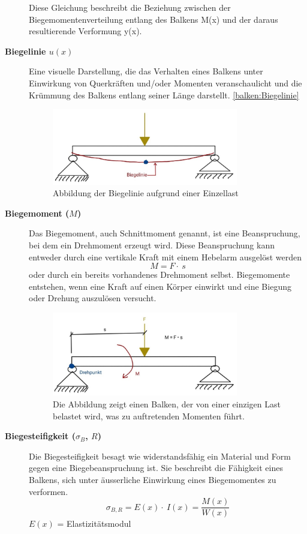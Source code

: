 \begin{description}
Diese Gleichung beschreibt die Beziehung zwischen der Biegemomentenverteilung entlang des Balkens M(x) und der daraus resultierende Verformung y(x).
\item[\textbf{Biegelinie $u(x)$}] Eine visuelle Darstellung, die das Verhalten eines Balkens unter Einwirkung von Querkräften und/oder Momenten veranschaulicht und die Krümmung des Balkens entlang seiner Länge darstellt. \ref{balken:Biegelinie}
\begin{figure} [h]
	\centering
	\includegraphics[width=0.8\textwidth]{papers/balken/images/teil1/Biegelinie1.jpg}
	\caption{Abbildung der Biegelinie aufgrund einer Einzellast}
	\label{fig:Abbildung der Biegelinie aufgrund einer Einzellast}
\end{figure}
\item[\textbf{Biegemoment ($M$)}] Das Biegemoment, auch Schnittmoment genannt, ist eine Beanspruchung, bei dem ein Drehmoment erzeugt wird.
Diese Beanspruchung kann entweder durch eine vertikale Kraft mit einem Hebelarm ausgelöst werden
\begin{equation}
	M=
	F\cdot\ s
\end{equation}
oder durch ein bereits vorhandenes Drehmoment selbst.
Biegemomente entstehen, wenn eine Kraft auf einen Körper einwirkt und eine Biegung oder Drehung auszulösen versucht.
\begin{figure} [h]
	\centering
	\includegraphics[width=0.8\textwidth]{papers/balken/images/teil1/Biegemoment.jpg}
	\caption{Die Abbildung zeigt einen Balken, der von einer einzigen Last belastet wird, was zu auftretenden Momenten führt.}
	\label{fig:Die Abbildung zeigt einen Balken, der von einer einzigen Last belastet wird, was zu auftretenden Momenten führt.}
\end{figure}
\item[\textbf{Biegesteifigkeit ($σ_B$, $R$)}] Die Biegesteifigkeit besagt wie widerstandsfähig ein Material und Form gegen eine Biegebeanspruchung ist.
Sie beschreibt die Fähigkeit eines Balkens, sich unter äusserliche Einwirkung eines Biegemomentes zu verformen.
\begin{equation}
\sigma_{B,R}=E
\left(x\right)\cdot\ I\left(x\right)=
\frac{M(x)}{W(x)}
\end{equation}
$E(x)$ = Elastizitätsmodul


\end{description}
